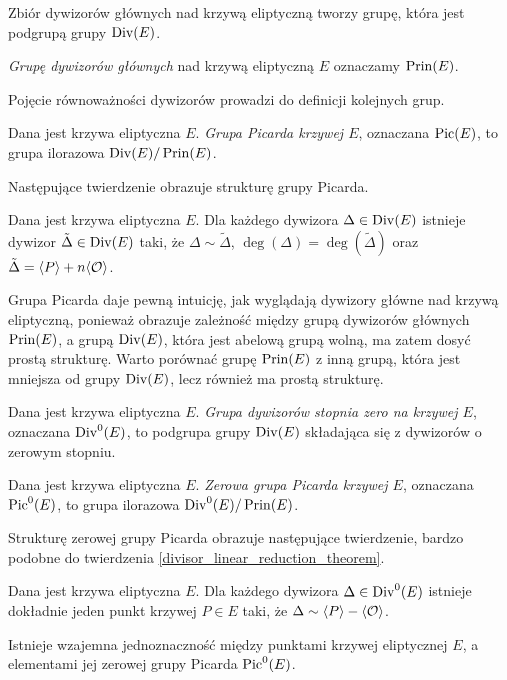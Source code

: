 \begin{corollary}
Zbiór dywizorów głównych nad krzywą eliptyczną tworzy grupę,
która jest podgrupą grupy $\operatorname{Div}(E)$.
\end{corollary}

\begin{definition}
\emph{Grupę dywizorów głównych} nad krzywą eliptyczną $E$
oznaczamy $\operatorname{Prin}(E)$.
\end{definition}

Pojęcie równoważności dywizorów prowadzi do definicji kolejnych grup.

\begin{definition}
Dana jest krzywa eliptyczna $E$.
\emph{Grupa Picarda krzywej $E$},
oznaczana $\operatorname{Pic}(E)$,
to grupa ilorazowa $\operatorname{Div}(E)/\operatorname{Prin}(E)$.
\end{definition}

Następujące twierdzenie obrazuje strukturę grupy Picarda.

\begin{theorem}\label{divisor_linear_reduction_theorem}
Dana jest krzywa eliptyczna $E$.
Dla każdego dywizora $\Delta \in \operatorname{Div}(E)$
istnieje dywizor $\tilde{\Delta} \in \operatorname{Div}(E)$ taki,
że $\Delta \sim \tilde{\Delta}$, $\deg(\Delta) = \deg(\tilde{\Delta})$
oraz $\tilde{\Delta} = \langle P\rangle + n\langle\mathcal{O}\rangle$.
\end{theorem}

Grupa Picarda daje pewną intuicję,
jak wyglądają dywizory główne nad krzywą eliptyczną,
ponieważ obrazuje zależność między grupą dywizorów głównych $\operatorname{Prin}(E)$,
a grupą $\operatorname{Div}(E)$, która jest abelową grupą wolną,
ma zatem dosyć prostą strukturę.
Warto porównać grupę $\operatorname{Prin}(E)$ z inną grupą,
która jest mniejsza od grupy $\operatorname{Div}(E)$,
lecz również ma prostą strukturę.

\begin{definition}
Dana jest krzywa eliptyczna $E$.
\emph{Grupa dywizorów stopnia zero na krzywej $E$},
oznaczana $\operatorname{Div}^0(E)$,
to podgrupa grupy $\operatorname{Div}(E)$ składająca się
z dywizorów o zerowym stopniu.
\end{definition}

\begin{definition}
Dana jest krzywa eliptyczna $E$.
\emph{Zerowa grupa Picarda krzywej $E$},
oznaczana $\operatorname{Pic}^0(E)$,
to grupa ilorazowa $\operatorname{Div}^0(E)/\operatorname{Prin}(E)$.
\end{definition}

Strukturę zerowej grupy Picarda obrazuje następujące twierdzenie,
bardzo podobne do twierdzenia \ref{divisor_linear_reduction_theorem}.

\begin{theorem}\label{zerodeg_divisor_linear_reduction_theorem}
Dana jest krzywa eliptyczna $E$.
Dla każdego dywizora $\Delta \in \operatorname{Div}^0(E)$
istnieje dokładnie jeden punkt krzywej $P \in E$ taki,
że $\Delta \sim \langle P\rangle - \langle\mathcal{O}\rangle$.
\end{theorem}

\begin{corollary}\label{piczero_curvepts_bijection_corollary}
Istnieje wzajemna jednoznaczność między punktami krzywej eliptycznej $E$,
a elementami jej zerowej grupy Picarda $\operatorname{Pic}^0(E)$.
\end{corollary}
